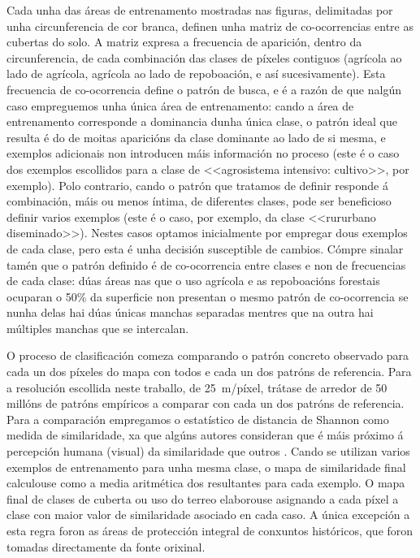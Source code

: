 \documentclass[11pt,a4paper]{article}
\begin{document}
Cada unha das áreas de entrenamento mostradas nas figuras, delimitadas por unha circunferencia de cor branca, definen unha matriz de co-ocorrencias entre as cubertas do solo. A matriz expresa a frecuencia de aparición, dentro da circunferencia, de cada combinación das clases de píxeles contiguos (agrícola ao lado de agrícola, agrícola ao lado de repoboación, e así sucesivamente). Esta frecuencia de co-ocorrencia define o patrón de busca, e é a razón de que nalgún caso empreguemos unha única área de entrenamento: cando a área de entrenamento corresponde a dominancia dunha única clase, o patrón ideal que resulta é do de moitas aparicións da clase dominante ao lado de si mesma, e exemplos adicionais non introducen máis información no proceso (este é o caso dos exemplos escollidos para a clase de <<agrosistema intensivo: cultivo>>, por exemplo). Polo contrario, cando o patrón que tratamos de definir responde á combinación, máis ou menos íntima, de diferentes clases, pode ser beneficioso definir varios exemplos (este é o caso, por exemplo, da clase <<rururbano diseminado>>). Nestes casos optamos inicialmente por empregar dous exemplos de cada clase, pero esta é unha decisión susceptible de cambios. Cómpre sinalar tamén que o patrón definido é de co-ocorrencia entre clases e non de frecuencias de cada clase: dúas áreas nas que o uso agrícola e as repoboacións forestais ocuparan o 50\% da superficie non presentan o mesmo patrón de co-ocorrencia se nunha delas hai dúas únicas manchas separadas mentres que na outra hai múltiples manchas que se intercalan.

O proceso de clasificación comeza comparando o patrón concreto observado para cada un dos píxeles do mapa con todos e cada un dos patróns de referencia. Para a resolución escollida neste traballo, de 25~m/píxel, trátase de arredor de 50 millóns de patróns empíricos a comparar con cada un dos patróns de referencia. Para a comparación empregamos o estatístico de distancia de Shannon \citep{Cha2007} como medida de similaridade, xa que algúns autores consideran que é máis próximo á percepción humana (visual) da similaridade que outros \citep{Jasiewicz2014104}. Cando se utilizan varios exemplos de entrenamento para unha mesma clase, o mapa de similaridade final calculouse como a media aritmética dos resultantes para cada exemplo. O mapa final de clases de cuberta ou uso do terreo elaborouse asignando a cada píxel a clase con maior valor de similaridade asociado en cada caso. A única excepción a esta regra foron as áreas de protección integral de conxuntos históricos, que foron tomadas directamente da fonte orixinal.
\end{document}
